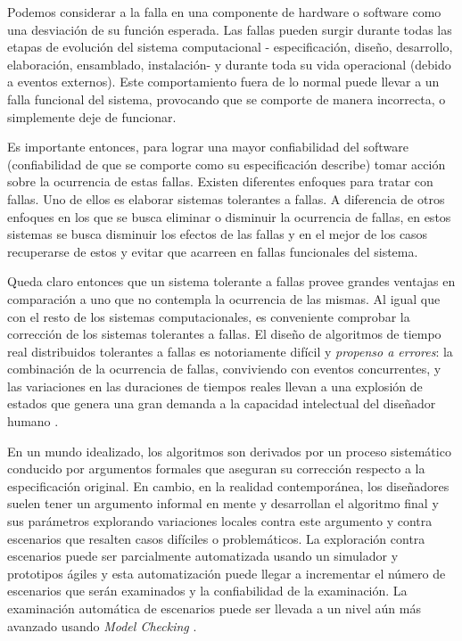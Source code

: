 \documentclass[pdftex,a4paper,12pt]{book}
\begin{document}
Podemos considerar a la falla en una componente de hardware o software como una desviaci\'on de su funci\'on esperada. Las fallas pueden surgir durante todas las etapas de evoluci\'on del sistema computacional - especificaci\'on, dise\~no, desarrollo, elaboraci\'on, ensamblado, instalaci\'on- y durante toda su vida operacional \cite{FaultInject} (debido a eventos externos). Este comportamiento fuera de lo normal puede llevar a un falla funcional del sistema, provocando que se comporte de manera incorrecta, o simplemente deje de funcionar.

Es importante entonces, para lograr una mayor confiabilidad del software (confiabilidad de que se comporte como su especificaci\'on describe) tomar acci\'on sobre la ocurrencia de estas fallas. Existen diferentes enfoques para tratar con fallas. Uno de ellos es elaborar sistemas tolerantes a fallas. A diferencia de otros enfoques en los que se busca eliminar o disminuir la ocurrencia de fallas, en estos sistemas se busca disminuir los efectos de las fallas y en el mejor de los casos recuperarse de estos y evitar que acarreen en fallas funcionales del sistema.

Queda claro entonces que un sistema tolerante a fallas provee grandes ventajas en comparaci\'on a uno que no contempla la ocurrencia de las mismas. Al igual que con el resto de los sistemas computacionales, es conveniente comprobar la correcci\'on de los sistemas tolerantes a fallas. El dise\~no de algoritmos de tiempo real distribuidos tolerantes a fallas es notoriamente dif\'icil y \emph{propenso a errores}: la combinaci\'on de la ocurrencia de fallas, conviviendo con eventos concurrentes, y las variaciones en las duraciones de tiempos reales llevan a una explosi\'on de estados que genera una gran demanda a la capacidad intelectual del dise\~nador humano \cite{SteinerRushby}.

En un mundo idealizado, los algoritmos son derivados por un proceso sistem\'atico conducido por argumentos formales que aseguran su correcci\'on respecto a la especificaci\'on original. En cambio, en la realidad contempor\'anea, los dise\~nadores suelen tener un argumento informal en mente y desarrollan el algoritmo final y sus par\'ametros explorando variaciones locales contra este argumento y contra escenarios que resalten casos dif\'iciles o problem\'aticos. La exploraci\'on contra escenarios puede ser parcialmente automatizada usando un simulador y prototipos \'agiles y esta automatizaci\'on puede llegar a incrementar el n\'umero de escenarios que ser\'an examinados y la confiabilidad de la examinaci\'on. La examinaci\'on autom\'atica de escenarios puede ser llevada a un nivel a\'un m\'as avanzado usando \emph{Model Checking} \cite{Baier}.
\end{document}
